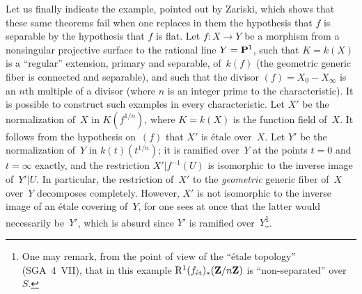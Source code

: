 Let us finally indicate the example, pointed out by Zariski, which shows
that these same theorems fail when one replaces in them
the hypothesis that $f$ is separable by the hypothesis that $f$ is
flat. Let $f\colon X\to Y$ be a morphism from a nonsingular projective
surface to the rational line $Y=\mathbf{P}^1$, such
that
$K=k(X)$
is a ``regular'' extension, \ie primary and
separable, of~$k(f)$ (\ie the geometric generic
fiber is connected and separable), and such that the
divisor $(f)=X_0-X_\infty$ is an
$n$th multiple
of a divisor (where $n$ is an integer prime to the
characteristic). It is possible to construct such examples
in every characteristic. Let $X'$ be the normalization of~$X$ in
$K(f^{1/n})$, where $K=k(X)$ is the function field of~$X$. It
follows from the hypothesis on~$(f)$ that $X'$ is \'etale
over~$X$. Let $Y'$ be the normalization of~$Y$ in $k(t)(t^{1/n})$; it
is ramified over~$Y$ at the points $t=0$ and $t=\infty$ exactly,
and the restriction $X'|f^{-1}(U)$ is isomorphic to the inverse image
of~$Y'|U$. In particular, the restriction of~$X'$ to the
\emph{geometric} generic fiber of~$X$ over~$Y$
decomposes completely. However, $X'$ is not isomorphic
to the inverse image of an \'etale covering of~$Y$, for one
sees at once that the latter would necessarily be~$Y'$, which
is absurd since $Y'$ is ramified over~$Y$\kern2pt\footnote{One may
remark, from the point of view of the ``\'etale topology'' (SGA~4~VII),
that in this example $\mathrm{R}^1(f_{\mathrm{\acute{e}t}})_*(\mathbf{Z}/n\mathbf{Z})$ is ``non-separated''
over~$S$.}.

